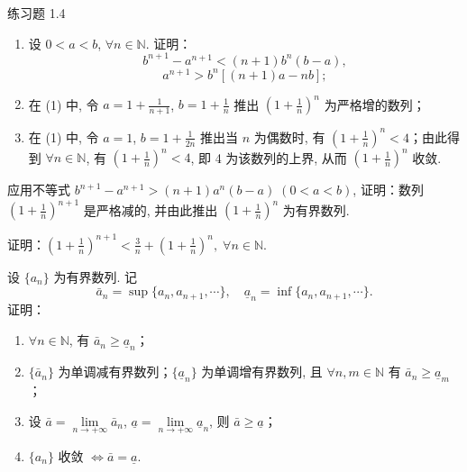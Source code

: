 \begin{exblock}{练习题 1.4}
\item 
\begin{enumerate}
\item 设 $0 < a < b$, $\forall n \in \mathbb{N}$. 证明：
\[
b^{n+1} - a^{n+1} < (n+1)b^{n}(b-a),
\]
\[
a^{n+1} > b^{n}[(n+1)a - nb];
\]
\item 在 (1) 中, 令 $a = 1 + \frac{1}{n+1}$, $b = 1 + \frac{1}{n}$ 推出 $\left(1+\frac{1}{n}\right)^{n}$ 为严格增的数列；
\item 在 (1) 中, 令 $a = 1$, $b = 1 + \frac{1}{2n}$ 推出当 $n$ 为偶数时, 有 $\left(1+\frac{1}{n}\right)^{n} < 4$；由此得到 $\forall n\in\mathbb{N}$, 有 $\left(1+\frac{1}{n}\right)^{n} < 4$, 即 4 为该数列的上界, 从而 $\left(1+\frac{1}{n}\right)^{n}$ 收敛.
\end{enumerate}

\item 应用不等式 $b^{n+1} - a^{n+1} > (n+1)a^{n}(b-a)\;(0 < a < b)$, 证明：数列 $\left(1 + \frac{1}{n}\right)^{n+1}$ 是严格减的, 并由此推出 $\left(1 + \frac{1}{n}\right)^n$ 为有界数列.

\item 证明：$\left(1 + \frac{1}{n}\right)^{n+1} < \frac{3}{n} + \left(1 + \frac{1}{n}\right)^n,\;\forall n\in\mathbb{N}$.

\item 设 $\{a_{n}\}$ 为有界数列. 记
\[
\bar{a}_{n} = \sup\{a_{n}, a_{n+1}, \cdots\},\quad \underline{a}_{n} = \inf\{a_{n}, a_{n+1}, \cdots\}.
\]
证明：
\begin{enumerate}
\item $\forall n \in \mathbb{N}$, 有 $\bar{a}_n \geqslant \underline{a}_n$；
\item $\{\bar{a}_{n}\}$ 为单调减有界数列；$\{\underline{a}_{n}\}$ 为单调增有界数列, 且 $\forall n, m\in\mathbb{N}$ 有 $\bar{a}_{n} \geqslant \underline{a}_{m}$；
\item 设 $\bar{a} = \lim\limits_{n \to +\infty} \bar{a}_n$, $\underline{a} = \lim\limits_{n \to +\infty} \underline{a}_n$, 则 $\bar{a} \geqslant \underline{a}$；
\item $\{a_{n}\}$ 收敛 $\iff \bar{a} = \underline{a}$.
\end{enumerate}
\end{exblock}

